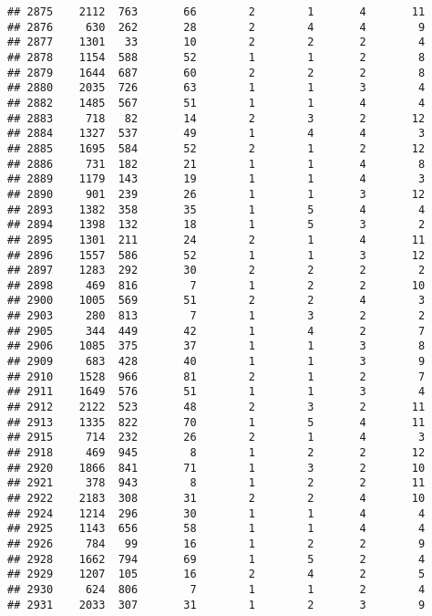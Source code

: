 \documentclass[]{article}
\begin{document}
\begin{verbatim}
## 2875    2112  763       66        2        1       4       11
## 2876     630  262       28        2        4       4        9
## 2877    1301   33       10        2        2       2        4
## 2878    1154  588       52        1        1       2        8
## 2879    1644  687       60        2        2       2        8
## 2880    2035  726       63        1        1       3        4
## 2882    1485  567       51        1        1       4        4
## 2883     718   82       14        2        3       2       12
## 2884    1327  537       49        1        4       4        3
## 2885    1695  584       52        2        1       2       12
## 2886     731  182       21        1        1       4        8
## 2889    1179  143       19        1        1       4        3
## 2890     901  239       26        1        1       3       12
## 2893    1382  358       35        1        5       4        4
## 2894    1398  132       18        1        5       3        2
## 2895    1301  211       24        2        1       4       11
## 2896    1557  586       52        1        1       3       12
## 2897    1283  292       30        2        2       2        2
## 2898     469  816        7        1        2       2       10
## 2900    1005  569       51        2        2       4        3
## 2903     280  813        7        1        3       2        2
## 2905     344  449       42        1        4       2        7
## 2906    1085  375       37        1        1       3        8
## 2909     683  428       40        1        1       3        9
## 2910    1528  966       81        2        1       2        7
## 2911    1649  576       51        1        1       3        4
## 2912    2122  523       48        2        3       2       11
## 2913    1335  822       70        1        5       4       11
## 2915     714  232       26        2        1       4        3
## 2918     469  945        8        1        2       2       12
## 2920    1866  841       71        1        3       2       10
## 2921     378  943        8        1        2       2       11
## 2922    2183  308       31        2        2       4       10
## 2924    1214  296       30        1        1       4        4
## 2925    1143  656       58        1        1       4        4
## 2926     784   99       16        1        2       2        9
## 2928    1662  794       69        1        5       2        4
## 2929    1207  105       16        2        4       2        5
## 2930     624  806        7        1        1       2        4
## 2931    2033  307       31        1        2       3        9

\end{verbatim}
\end{document}
